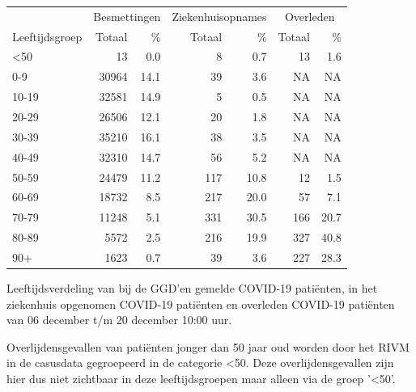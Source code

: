 \documentclass[
  english,
  man,floatsintext]{apa6}
\begin{document}
\begin{table}
\centering\begingroup\fontsize{11}{13}\selectfont

\begin{threeparttable}
\begin{tabular}{lrrrrrr}
\toprule
\multicolumn{1}{c}{ } & \multicolumn{2}{c}{Besmettingen} & \multicolumn{2}{c}{Ziekenhuisopnames} & \multicolumn{2}{c}{Overleden} \\
\cmidrule(l{3pt}r{3pt}){2-3} \cmidrule(l{3pt}r{3pt}){4-5} \cmidrule(l{3pt}r{3pt}){6-7}
Leeftijdsgroep & Totaal & \% & Totaal & \% & Totaal & \%\\
\midrule
<50 & 13 & 0.0 & 8 & 0.7 & 13 & 1.6\\
0-9 & 30964 & 14.1 & 39 & 3.6 & NA & NA\\
10-19 & 32581 & 14.9 & 5 & 0.5 & NA & NA\\
20-29 & 26506 & 12.1 & 20 & 1.8 & NA & NA\\
30-39 & 35210 & 16.1 & 38 & 3.5 & NA & NA\\
40-49 & 32310 & 14.7 & 56 & 5.2 & NA & NA\\
50-59 & 24479 & 11.2 & 117 & 10.8 & 12 & 1.5\\
60-69 & 18732 & 8.5 & 217 & 20.0 & 57 & 7.1\\
70-79 & 11248 & 5.1 & 331 & 30.5 & 166 & 20.7\\
80-89 & 5572 & 2.5 & 216 & 19.9 & 327 & 40.8\\
90+ & 1623 & 0.7 & 39 & 3.6 & 227 & 28.3\\
\bottomrule
\end{tabular}
\begin{tablenotes}
\item[1] Leeftijdsverdeling van bij de GGD’en gemelde COVID-19 patiënten, in het ziekenhuis opgenomen COVID-19 patiënten en overleden COVID-19 patiënten van 06 december t/m 20 december 10:00 uur.
\item[2] Overlijdensgevallen van patiënten jonger dan 50 jaar oud worden door het RIVM in de casusdata gegroepeerd in de categorie <50. Deze overlijdensgevallen zijn hier dus niet zichtbaar in deze leeftijdsgroepen maar alleen via de groep '<50'.
\end{tablenotes}
\end{threeparttable}
\endgroup{}
\end{table}

\newpage
\end{document}
